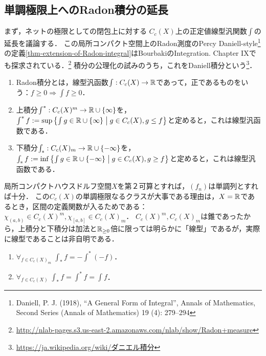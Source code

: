 \documentclass[uplatex,dvipdfmx]{jsreport}
\begin{document}
\subsection{単調極限上へのRadon積分の延長}

\begin{tcolorbox}[colframe=ForestGreen, colback=ForestGreen!10!white,breakable,colbacktitle=ForestGreen!40!white,coltitle=black,fonttitle=\bfseries\sffamily,
title=]
    まず，ネットの極限としての閉包上に対する
    $C_c(X)$上の正定値線型汎関数$\int$の延長を議論する．
    この局所コンパクト空間上のRadon測度のPercy Daniell-style\footnote{Daniell, P. J. (1918), “A General Form of Integral”, Annals of Mathematics, Second Series (Annals of Mathematics) 19 (4): 279–294}の定義\ref{thm-extension-of-Radon-integral}はBourbakiのIntegration. Chapter IXでも探求されている．\footnote{\url{http://nlab-pages.s3.us-east-2.amazonaws.com/nlab/show/Radon+measure}}
    積分の公理化の試みのうち，これをDaniell積分という\footnote{\url{https://ja.wikipedia.org/wiki/ダニエル積分}}．
\end{tcolorbox}

\begin{definition}\mbox{}
    \begin{enumerate}
        \item Radon積分とは，線型汎函数$\int:C_c(X)\to\mathbb{R}$であって，正であるものをいう：$f\ge 0\Rightarrow\int f\ge 0$．
        \item 上積分$\int^*:C_c(X)^m\to\mathbb{R}\cup\{\infty\}$を，$\int^*f:=\sup\left\{\int g\in\mathbb{R}\cup\{\infty\}\;\middle|\;g\in C_c(X),g\le f\right\}$と定めると，これは線型汎函数である．
        \item 下積分$\int_*:C_c(X)_m\to\mathbb{R}\cup\{-\infty\}$を，$\int_*f:=\inf\left\{\int g\in\mathbb{R}\cup\{-\infty\}\;\middle|\;g\in C_c(X),g\ge f\right\}$と定めると，これは線型汎函数である．
    \end{enumerate}
\end{definition}
\begin{remarks}
    局所コンパクトハウスドルフ空間$X$を第２可算とすれば，$(f_n)$は単調列とすれば十分．
    この$C_c(X)$の単調極限なるクラスが大事である理由は，$X=\mathbb{R}$であるとき，区間の定義関数が入るためである：$\chi_{(a,b)}\in C_c(X)^m,\chi_{[a,b]}\in C_c(X)_m$．
    $C_c(X)^m,C_c(X)_m$は錐であったから，上積分と下積分は加法と$\mathbb{R}_{\ge 0}$倍に限っては明らかに「線型」であるが，実際に線型であることは非自明である．
\end{remarks}

\begin{lemma}\mbox{}
    \begin{enumerate}
        \item $\forall_{f\in C_c(X)_m}\;\int_*f=-\int^*(-f)$．
        \item $\forall_{f\in C_c(X)}\;\int_*f=\int^*f=\int f$．
    \end{enumerate}
\end{lemma}
\end{document}
